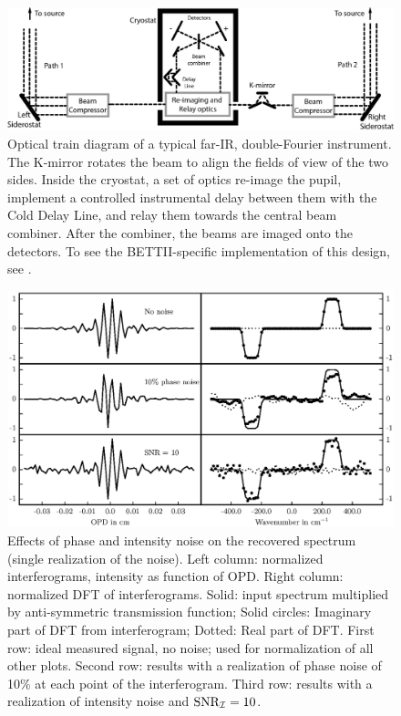 \begin{landscape}
\begin{figure}[ht!]
\begin{center}
\includegraphics[width=1.5\textwidth]{Figures/f2.eps}
\caption[optics]{Optical train diagram of a typical far-IR, double-Fourier instrument. The K-mirror rotates the beam to align the fields of view of the two sides. Inside the cryostat, a set of optics re-image the pupil, implement a controlled instrumental delay between them with the Cold Delay Line, and relay them towards the central beam combiner. After the combiner, the beams are imaged onto the detectors. To see the BETTII-specific implementation of this design, see \cite{2014PASP..126..660R}.}
\label{fig:optics}
\end{center}
\end{figure}
\end{landscape}

\begin{figure}[ht!]
\begin{center}
\includegraphics[width=\textwidth]{Figures/f3.eps}
\caption[interfero]{Effects of phase and intensity noise on the recovered spectrum (single realization of the noise). Left column: normalized interferograms, intensity as function of OPD. Right column: normalized DFT of interferograms. Solid: input spectrum multiplied by anti-symmetric transmission function; Solid circles: Imaginary part of DFT from interferogram; Dotted: Real part of DFT. First row: ideal measured signal, no noise; used for normalization of all other plots. Second row: results with a realization of phase noise of 10\% at each point of the interferogram. Third row: results with a realization of intensity noise and $\textrm{SNR}_{\mathcal{I}}=10$.}
\label{fig:interfero}
\end{center}
\end{figure}


